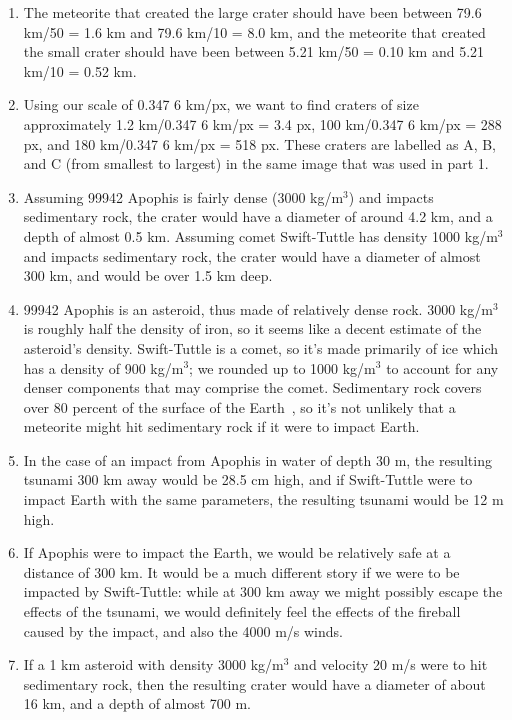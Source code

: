 \documentclass[11pt]{article}
\begin{document}
\begin{enumerate}[label={\textbf{\emph{(\arabic*)}}}]
	\item %
The meteorite that created the large crater should have been between 79.6 km/50 = 1.6 km and 79.6 km/10 = 8.0 km, and the meteorite that created the small crater should have been between 5.21 km/50 = 0.10 km and 5.21 km/10 = 0.52 km.

	\item %
Using our scale of 0.347 6 km/px, we want to find craters of size approximately 1.2 km/0.347 6 km/px = 3.4 px, 100 km/0.347 6 km/px = 288 px, and 180 km/0.347 6 km/px = 518 px.
These craters are labelled as A, B, and C (from smallest to largest) in the same image that was used in part 1.

	\item %
Assuming 99942 Apophis is fairly dense (3000 kg/m$^3$) and impacts sedimentary rock, the crater would have a diameter of around 4.2 km, and a depth of almost 0.5 km.
Assuming comet Swift-Tuttle has density 1000 kg/m$^3$ and impacts sedimentary rock, the crater would have a diameter of almost 300 km, and would be over 1.5 km deep.

	\item %
99942 Apophis is an asteroid, thus made of relatively dense rock.
3000 kg/m$^3$ is roughly half the density of iron, so it seems like a decent estimate of the asteroid's density.
Swift-Tuttle is a comet, so it's made primarily of ice which has a density of 900 kg/m$^3$; we rounded up to 1000 kg/m$^3$ to account for any denser components that may comprise the comet.
Sedimentary rock covers over 80 percent of the surface of the Earth~\cite{britannica-sedimentary}, so it's not unlikely that a meteorite might hit sedimentary rock if it were to impact Earth.

	\item %
In the case of an impact from Apophis in water of depth 30 m, the resulting tsunami 300 km away would be 28.5 cm high, and if Swift-Tuttle were to impact Earth with the same parameters, the resulting tsunami would be 12 m high.

	\item %
If Apophis were to impact the Earth, we would be relatively safe at a distance of 300 km.
It would be a much different story if we were to be impacted by Swift-Tuttle: while at 300 km away we might possibly escape the effects of the tsunami, we would definitely feel the effects of the fireball caused by the impact, and also the 4000 m/s winds.

	\item %
If a 1 km asteroid with density 3000 kg/m$^3$ and velocity 20 m/s were to hit sedimentary rock, then the resulting crater would have a diameter of about 16 km, and a depth of almost 700 m.


\end{enumerate}
\end{document}
